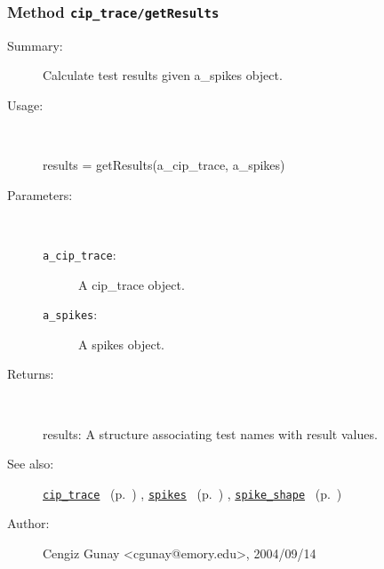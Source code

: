 \subsubsection[Method \texttt{getResults}]{Method \texttt{cip\_trace/getResults}}%
%
\label{ref_cip_trace__getResults}%
\hypertarget{ref_cip_trace__getResults}{}%
\begin{description}
\item[Summary:]Calculate test results given a\_spikes object.
%
\item[Usage:]~%
\begin{lyxcode}%
results = getResults(a\_cip\_trace, a\_spikes)
%
\end{lyxcode}%
%
%
\item[Parameters:]~
\begin{description}%
\item[\texttt{a\_cip\_trace}:]
 A cip\_trace object.
\item[\texttt{a\_spikes}:]
 A spikes object.
\end{description}%
%
\item[Returns:]~

	results: A structure associating test names with result values.
%
%
\item[See also:]%
\hyperlink{ref_cip_trace}{\texttt{cip\_trace}}%
\ (p.~\pageref{ref_cip_trace})%
%
, \hyperlink{ref_spikes}{\texttt{spikes}}%
\ (p.~\pageref{ref_spikes})%
%
, \hyperlink{ref_spike_shape}{\texttt{spike\_shape}}%
\ (p.~\pageref{ref_spike_shape})%
%
%
\item[Author:]%
Cengiz Gunay <cgunay@emory.edu>, 2004/09/14%
\end{description}
\methodline%
